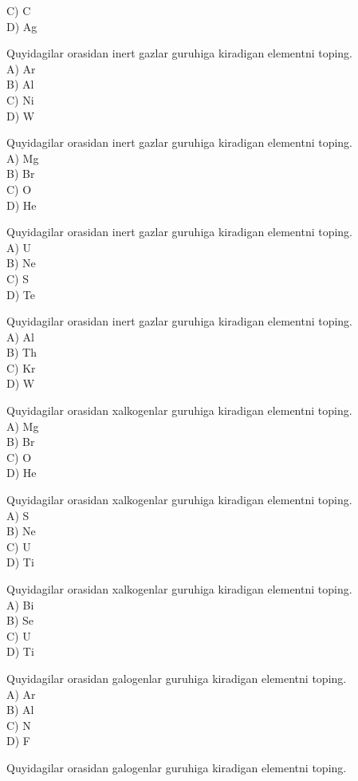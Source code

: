 C) C\\
D) Ag
  \item Quyidagilar orasidan inert gazlar guruhiga kiradigan elementni toping.\\
A) Ar\\
B) Al\\
C) Ni\\
D) W
  \item Quyidagilar orasidan inert gazlar guruhiga kiradigan elementni toping.\\
A) Mg\\
B) Br\\
C) O\\
D) He
  \item Quyidagilar orasidan inert gazlar guruhiga kiradigan elementni toping.\\
A) U\\
B) Ne\\
C) S\\
D) Te
  \item Quyidagilar orasidan inert gazlar guruhiga kiradigan elementni toping.\\
A) Al\\
B) Th\\
C) Kr\\
D) W
  \item Quyidagilar orasidan xalkogenlar guruhiga kiradigan elementni toping.\\
A) Mg\\
B) Br\\
C) O\\
D) He
  \item Quyidagilar orasidan xalkogenlar guruhiga kiradigan elementni toping.\\
A) S\\
B) Ne\\
C) U\\
D) Ti
  \item Quyidagilar orasidan xalkogenlar guruhiga kiradigan elementni toping.\\
A) Bi\\
B) Se\\
C) U\\
D) Ti
  \item Quyidagilar orasidan galogenlar guruhiga kiradigan elementni toping.\\
A) Ar\\
B) Al\\
C) N\\
D) F
  \item Quyidagilar orasidan galogenlar guruhiga kiradigan elementni toping.\\
